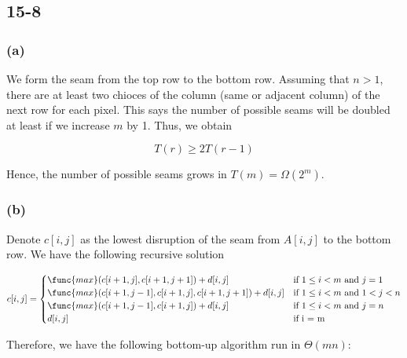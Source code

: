 \subsection*{15-8}

\subsubsection*{(a)}

\noindent
We form the seam from the top row to the bottom row. 
Assuming that $n>1$,
there are at least two chioces of the column (same or adjacent column) 
of the next row for each pixel.
This says the number of possible seams will be doubled at least
if we increase $m$ by 1.
Thus, we obtain

\begin{equation*}
    T(r) \geq 2T(r-1)
\end{equation*}

\noindent
Hence, the number of possible seams grows in $T(m) = \Omega(2^m)$.

\subsubsection*{(b)}

\noindent
Denote $c[i,j]$ as the lowest disruption of the seam 
from $A[i,j]$ to the bottom row.
We have the following recursive solution

\begin{equation*}
    c[i,j] = 
    \begin{cases}
        \func{max}(c[i+1,j], c[i+1,j+1]) + d[i,j]
            & \text{if } 1 \leq i < m \text{ and } j = 1 \\
        \func{max}(c[i+1,j-1], c[i+1,j], c[i+1,j+1]) + d[i,j]
            & \text{if } 1 \leq i < m \text{ and } 1 < j < n \\
        \func{max}(c[i+1,j-1], c[i+1,j]) + d[i,j]
            & \text{if } 1 \leq i < m \text{ and } j = n \\
        d[i,j] & \text{if } $i = m$
    \end{cases}
\end{equation*}

\noindent
Therefore, we have the following bottom-up algorithm run in $\Theta(mn)$:

